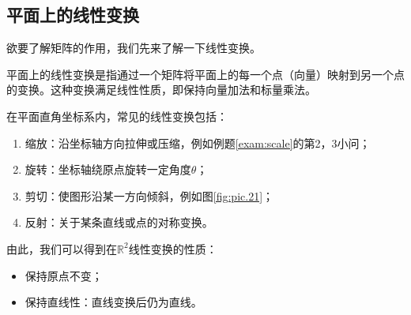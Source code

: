 \begin{example}
\end{example}

\subsection{平面上的线性变换}

欲要了解矩阵的作用，我们先来了解一下线性变换。

平面上的线性变换是指通过一个矩阵将平面上的每一个点（向量）映射到另一个点的变换。这种变换满足线性性质，即保持向量加法和标量乘法。

在平面直角坐标系内，常见的线性变换包括：
\begin{enumerate}
	\item 缩放：沿坐标轴方向拉伸或压缩，例如例题\ref{exam:scale}的第2，3小问；
	\item 旋转：坐标轴绕原点旋转一定角度$\theta$；
	\item 剪切：使图形沿某一方向倾斜，例如图\ref{fig:pic.21}；
	\item 反射：关于某条直线或点的对称变换。
\end{enumerate}

由此，我们可以得到在$^2$线性变换的性质：

\begin{itemize}
	\item 保持原点不变；
	\item 保持直线性：直线变换后仍为直线。
\end{itemize}

